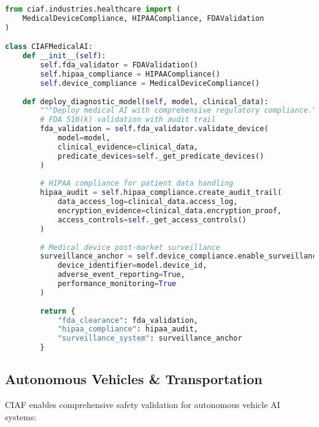 \documentclass[12pt,a4paper]{article}
\begin{document}
\begin{lstlisting}[language=Python, caption=Medical AI Compliance Implementation]
from ciaf.industries.healthcare import (
    MedicalDeviceCompliance, HIPAACompliance, FDAValidation
)

class CIAFMedicalAI:
    def __init__(self):
        self.fda_validator = FDAValidation()
        self.hipaa_compliance = HIPAACompliance()
        self.device_compliance = MedicalDeviceCompliance()
    
    def deploy_diagnostic_model(self, model, clinical_data):
        """Deploy medical AI with comprehensive regulatory compliance."""
        # FDA 510(k) validation with audit trail
        fda_validation = self.fda_validator.validate_device(
            model=model,
            clinical_evidence=clinical_data,
            predicate_devices=self._get_predicate_devices()
        )
        
        # HIPAA compliance for patient data handling
        hipaa_audit = self.hipaa_compliance.create_audit_trail(
            data_access_log=clinical_data.access_log,
            encryption_evidence=clinical_data.encryption_proof,
            access_controls=self._get_access_controls()
        )
        
        # Medical device post-market surveillance
        surveillance_anchor = self.device_compliance.enable_surveillance(
            device_identifier=model.device_id,
            adverse_event_reporting=True,
            performance_monitoring=True
        )
        
        return {
            "fda_clearance": fda_validation,
            "hipaa_compliance": hipaa_audit,
            "surveillance_system": surveillance_anchor
        }
\end{lstlisting}

\subsection{Autonomous Vehicles \& Transportation}

CIAF enables comprehensive safety validation for autonomous vehicle AI systems:
\end{document}
